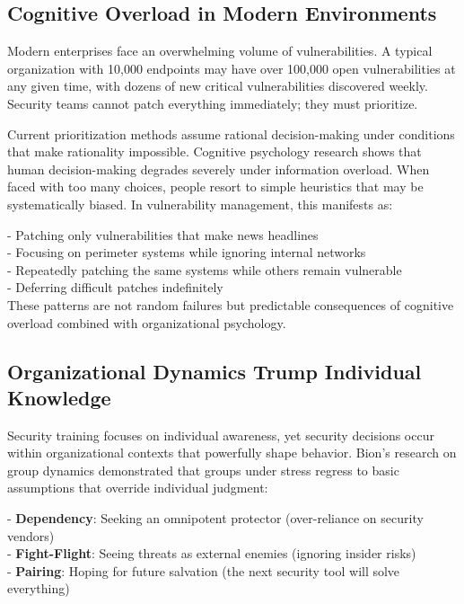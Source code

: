 \documentclass[11pt,a4paper]{article}
\begin{document}
\subsection{Cognitive Overload in Modern Environments}

Modern enterprises face an overwhelming volume of vulnerabilities. A typical organization with 10,000 endpoints may have over 100,000 open vulnerabilities at any given time, with dozens of new critical vulnerabilities discovered weekly\cite{nvd2023}. Security teams cannot patch everything immediately; they must prioritize.

Current prioritization methods assume rational decision-making under conditions that make rationality impossible. Cognitive psychology research shows that human decision-making degrades severely under information overload\cite{miller1956}. When faced with too many choices, people resort to simple heuristics that may be systematically biased. In vulnerability management, this manifests as:

- Patching only vulnerabilities that make news headlines\\
- Focusing on perimeter systems while ignoring internal networks\\
- Repeatedly patching the same systems while others remain vulnerable\\
- Deferring difficult patches indefinitely\\


These patterns are not random failures but predictable consequences of cognitive overload combined with organizational psychology.

\subsection{Organizational Dynamics Trump Individual Knowledge}

Security training focuses on individual awareness, yet security decisions occur within organizational contexts that powerfully shape behavior. Bion's research on group dynamics\cite{bion1961} demonstrated that groups under stress regress to basic assumptions that override individual judgment:

- \textbf{Dependency}: Seeking an omnipotent protector (over-reliance on security vendors)\\
- \textbf{Fight-Flight}: Seeing threats as external enemies (ignoring insider risks)\\
- \textbf{Pairing}: Hoping for future salvation (the next security tool will solve everything)\\
\end{document}
